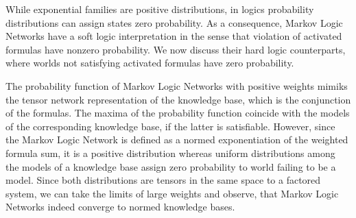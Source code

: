 \label{sec:hardNetworks} %

While exponential families are positive distributions, in logics probability distributions can assign states zero probability.
As a consequence, Markov Logic Networks have a soft logic interpretation in the sense that violation of activated formulas have nonzero probability.
We now discuss their hard logic counterparts, where worlds not satisfying activated formulas have zero probability.


The probability function of Markov Logic Networks with positive weights mimiks the tensor network representation of the knowledge base, which is the conjunction of the formulas.
The maxima of the probability function coincide with the models of the corresponding knowledge base, if the latter is satisfiable.
However, since the Markov Logic Network is defined as a normed exponentiation of the weighted formula sum, it is a positive distribution whereas uniform distributions among the models of a knowledge base assign zero probability to world failing to be a model.
Since both distributions are tensors in the same space to a factored system, we can take the limits of large weights and observe, that Markov Logic Networks indeed converge to normed knowledge bases.

